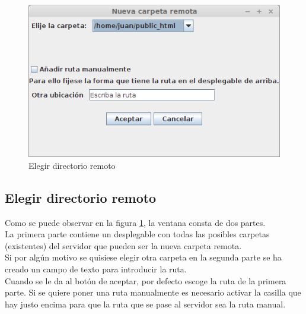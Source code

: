 \begin{figure}[htb]
	\centering
	\includegraphics[scale=0.7]{imagenes/remote_folder_gui.png}
	\caption{Elegir directorio remoto}
	\label{fig:remote_folder_gui}
\end{figure}

\subsection{Elegir directorio remoto}
Como se puede observar en la figura \ref{fig:remote_folder_gui}, la ventana consta de dos partes.\\ La primera parte contiene un desplegable con todas las posibles carpetas (existentes) del servidor que pueden ser la nueva carpeta remota.
\\Si por algún motivo se quisiese elegir otra carpeta en la segunda parte se ha creado un campo de texto para introducir la ruta. \\Cuando se le da al botón de aceptar, por defecto escoge la ruta de la primera parte. Si se quiere poner una ruta manualmente es necesario activar la casilla que hay justo encima para que la ruta que se pase al servidor sea la ruta manual.
